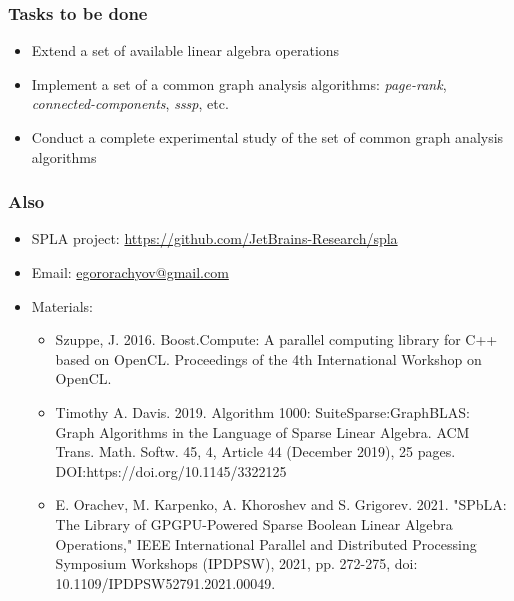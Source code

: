 \documentclass[aspectratio=169,xcolor=table,english]{beamer}
\begin{document}
\begin{frame}[fragile] \frametitle{Tasks to be done}
    \begin{itemize}
        \item Extend a set of available linear algebra operations
        \item  Implement a set of a common graph analysis algorithms: \textit{page-rank}, \textit{connected-components}, \textit{sssp}, etc.
        \item Conduct a complete experimental study of the set of common graph analysis algorithms
    \end{itemize}
\end{frame}

\begin{frame} \frametitle{Also}
    \begin{itemize}
        \item SPLA project: \href{https://github.com/JetBrains-Research/cuBool}{https://github.com/JetBrains-Research/spla}
        \item Email: \href{mailto:egororachyov@gmail.com}{egororachyov@gmail.com}
        \item Materials:
        {
            \begin{itemize}
                \item Szuppe, J. 2016. Boost.Compute: A parallel computing library for C++ based on OpenCL. Proceedings of the 4th International Workshop on OpenCL.
                \item Timothy A. Davis. 2019. Algorithm 1000: SuiteSparse:GraphBLAS: Graph Algorithms in the Language of Sparse Linear Algebra. ACM Trans. Math. Softw. 45, 4, Article 44 (December 2019), 25 pages. DOI:https://doi.org/10.1145/3322125
                \item E. Orachev, M. Karpenko, A. Khoroshev and S. Grigorev. 2021. "SPbLA: The Library of GPGPU-Powered Sparse Boolean Linear Algebra Operations," IEEE International Parallel and Distributed Processing Symposium Workshops (IPDPSW), 2021, pp. 272-275, doi: 10.1109/IPDPSW52791.2021.00049.
            \end{itemize}
        }
    \end{itemize}
\end{frame}
\end{document}
